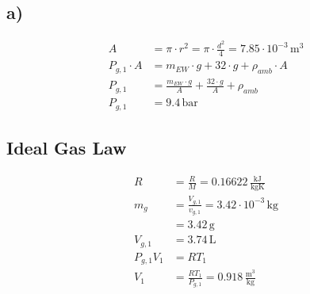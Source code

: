 

\subsection*{a)}

\begin{align*}
A &= \pi \cdot r^2 = \pi \cdot \frac{d^2}{4} = 7.85 \cdot 10^{-3} \, \text{m}^3 \\
P_{g,1} \cdot A &= m_{EW} \cdot g + 32 \cdot g + \rho_{amb} \cdot A \\
P_{g,1} &= \frac{m_{EW} \cdot g}{A} + \frac{32 \cdot g}{A} + \rho_{amb} \\
P_{g,1} &= 9.4 \, \text{bar}
\end{align*}

\subsection*{Ideal Gas Law}

\begin{align*}
R &= \frac{R}{M} = 0.16622 \, \frac{\text{kJ}}{\text{kgK}} \\
m_g &= \frac{V_{g,1}}{v_{g,1}} = 3.42 \cdot 10^{-3} \, \text{kg} \\
&= 3.42 \, \text{g} \\
V_{g,1} &= 3.74 \, \text{L} \\
P_{g,1} V_1 &= RT_1 \\
V_1 &= \frac{RT_1}{P_{g,1}} = 0.918 \, \frac{\text{m}^3}{\text{kg}}
\end{align*}